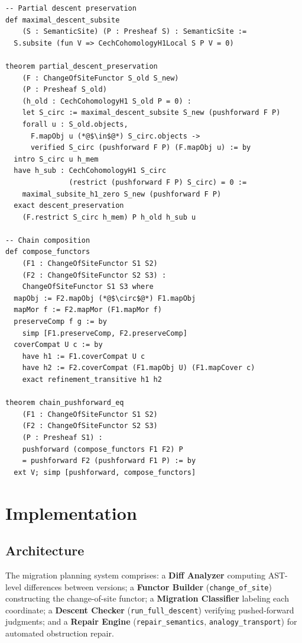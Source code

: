 \documentclass[11pt]{article}
\newcommand{\ChangeOfSite}{\texttt{change\_of\_site}}
\newcommand{\RunDescent}{\texttt{run\_full\_descent}}
\newcommand{\RepairSem}{\texttt{repair\_semantics}}
\newcommand{\AnalTrans}{\texttt{analogy\_transport}}
\begin{document}
\begin{lstlisting}[style=jugeo-python,title=Partial Preservation and Chain Composition]
-- Partial descent preservation
def maximal_descent_subsite
    (S : SemanticSite) (P : Presheaf S) : SemanticSite :=
  S.subsite (fun V => CechCohomologyH1Local S P V = 0)

theorem partial_descent_preservation
    (F : ChangeOfSiteFunctor S_old S_new)
    (P : Presheaf S_old)
    (h_old : CechCohomologyH1 S_old P = 0) :
    let S_circ := maximal_descent_subsite S_new (pushforward F P)
    forall u : S_old.objects,
      F.mapObj u (*@$\in$@*) S_circ.objects ->
      verified S_circ (pushforward F P) (F.mapObj u) := by
  intro S_circ u h_mem
  have h_sub : CechCohomologyH1 S_circ
               (restrict (pushforward F P) S_circ) = 0 :=
    maximal_subsite_h1_zero S_new (pushforward F P)
  exact descent_preservation
    (F.restrict S_circ h_mem) P h_old h_sub u

-- Chain composition
def compose_functors
    (F1 : ChangeOfSiteFunctor S1 S2)
    (F2 : ChangeOfSiteFunctor S2 S3) :
    ChangeOfSiteFunctor S1 S3 where
  mapObj := F2.mapObj (*@$\circ$@*) F1.mapObj
  mapMor f := F2.mapMor (F1.mapMor f)
  preserveComp f g := by
    simp [F1.preserveComp, F2.preserveComp]
  coverCompat U c := by
    have h1 := F1.coverCompat U c
    have h2 := F2.coverCompat (F1.mapObj U) (F1.mapCover c)
    exact refinement_transitive h1 h2

theorem chain_pushforward_eq
    (F1 : ChangeOfSiteFunctor S1 S2)
    (F2 : ChangeOfSiteFunctor S2 S3)
    (P : Presheaf S1) :
    pushforward (compose_functors F1 F2) P
    = pushforward F2 (pushforward F1 P) := by
  ext V; simp [pushforward, compose_functors]
\end{lstlisting}

\section{Implementation}\label{sec:implementation}

\subsection{Architecture}
The migration planning system comprises: a \textbf{Diff Analyzer} computing
AST-level differences between versions; a \textbf{Functor Builder}
(\ChangeOfSite) constructing the change-of-site functor; a \textbf{Migration
Classifier} labeling each coordinate; a \textbf{Descent Checker}
(\RunDescent) verifying pushed-forward judgments; and a \textbf{Repair
Engine} (\RepairSem, \AnalTrans) for automated obstruction repair.
\end{document}
